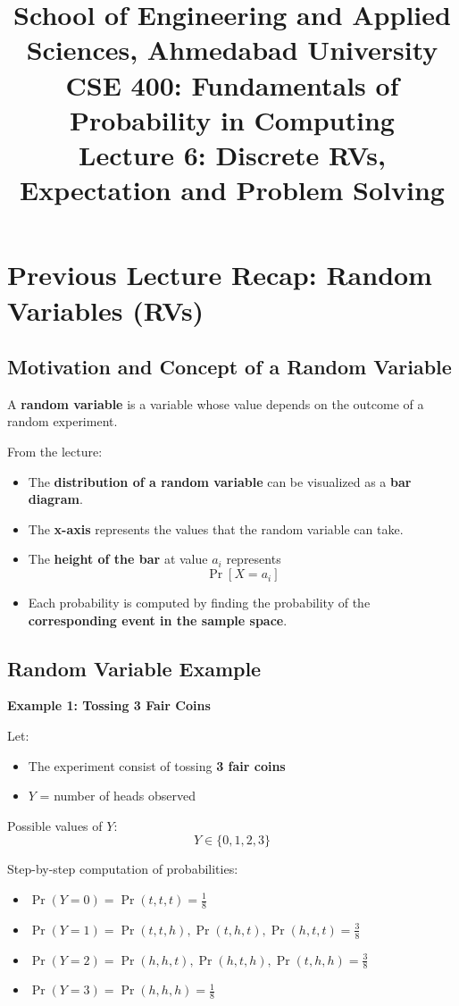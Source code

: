 \documentclass[11pt]{article}
\title{
    \normalsize School of Engineering and Applied Sciences, Ahmedabad University \\
    \vspace{0.2cm}
    \textbf{CSE 400: Fundamentals of Probability in Computing} \\
    \vspace{0.2cm}
    \Large Lecture 6: Discrete RVs, Expectation and Problem Solving
}
\date{}
\begin{document}
\maketitle
\onehalfspacing

\section{Previous Lecture Recap: Random Variables (RVs)}

\subsection{Motivation and Concept of a Random Variable}

A \textbf{random variable} is a variable whose value depends on the outcome of a random experiment.

From the lecture:
\begin{itemize}
    \item The \textbf{distribution of a random variable} can be visualized as a \textbf{bar diagram}.
    \item The \textbf{x-axis} represents the values that the random variable can take.
    \item The \textbf{height of the bar} at value $a_i$ represents
    \[
        \Pr[X = a_i]
    \]
    \item Each probability is computed by finding the probability of the \textbf{corresponding event in the sample space}.
\end{itemize}

\subsection{Random Variable Example}

\textbf{Example 1: Tossing 3 Fair Coins}

Let:
\begin{itemize}
    \item The experiment consist of tossing \textbf{3 fair coins}
    \item $Y$ = number of heads observed
\end{itemize}

Possible values of $Y$:
\[
Y \in \{0,1,2,3\}
\]

Step-by-step computation of probabilities:
\begin{itemize}
    \item $\Pr(Y = 0) = \Pr(t,t,t) = \frac{1}{8}$
    \item $\Pr(Y = 1) = \Pr(t,t,h), \Pr(t,h,t), \Pr(h,t,t) = \frac{3}{8}$
    \item $\Pr(Y = 2) = \Pr(h,h,t), \Pr(h,t,h), \Pr(t,h,h) = \frac{3}{8}$
    \item $\Pr(Y = 3) = \Pr(h,h,h) = \frac{1}{8}$
\end{itemize}
\end{document}

